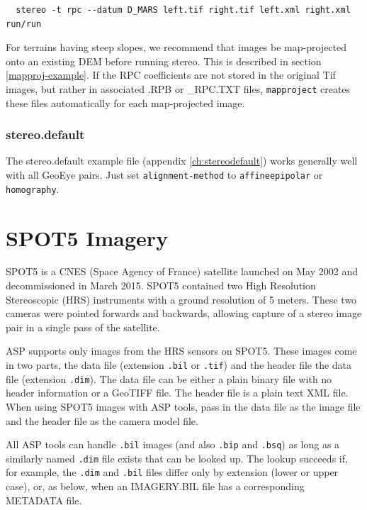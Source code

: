 \begin{verbatim}
  stereo -t rpc --datum D_MARS left.tif right.tif left.xml right.xml run/run
\end{verbatim}

For terrains having steep slopes, we recommend that images be
map-projected onto an existing DEM before running stereo. This is
described in section \ref{mapproj-example}. If the RPC coefficients are
not stored in the original Tif images, but rather in associated .RPB or
\_RPC.TXT files, \texttt{mapproject} creates
these files automatically for each map-projected image.

\subsubsection*{stereo.default}

The stereo.default example file (appendix \ref{ch:stereodefault})
works generally well with all GeoEye pairs. Just set
\texttt{alignment-method} to \texttt{affineepipolar} or
\texttt{homography}.


\section{SPOT5 Imagery}
\label{sec:spot5}

SPOT5 is a CNES (Space Agency of France) satellite launched on May 2002 and 
decommissioned in March 2015.  SPOT5 contained two High Resolution Stereoscopic 
(HRS) instruments with a ground resolution of 5 meters.  These two cameras were
pointed forwards and backwards, allowing capture of a stereo image pair in
a single pass of the satellite.

ASP supports only images from the HRS sensors on SPOT5.  These images come in
two parts, the data file (extension \texttt{.bil} or \texttt{.tif}) and the header file
the data file (extension \texttt{.dim}).  The data file can be either a plain 
binary file with no header information or a GeoTIFF file.  The header file is a 
plain text XML file.  When using SPOT5 images with ASP tools, pass in the data file
as the image file and the header file as the camera model file.

All ASP tools can handle \texttt{.bil} images (and also \texttt{.bip}
and \texttt{.bsq}) as long as a similarly named \texttt{.dim} file
exists that can be looked up. The lookup succeeds if, for example, the
\texttt{.dim} and \texttt{.bil} files differ only by extension (lower or
upper case), or, as below, when an IMAGERY.BIL file has a corresponding
METADATA file.


